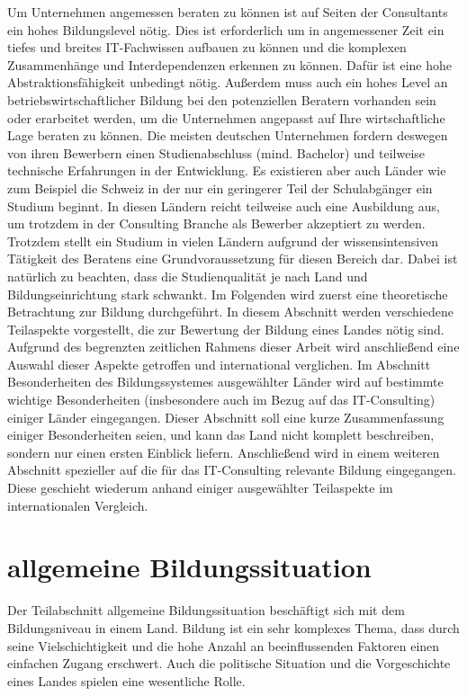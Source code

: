 Um Unternehmen angemessen beraten zu können ist auf Seiten der Consultants ein hohes Bildungslevel nötig. Dies ist erforderlich um in angemessener Zeit ein tiefes und breites IT-Fachwissen aufbauen zu können und die komplexen Zusammenhänge und Interdependenzen erkennen zu können. Dafür ist eine hohe Abstraktionsfähigkeit unbedingt nötig. Außerdem muss auch ein hohes Level an betriebswirtschaftlicher Bildung bei den potenziellen Beratern vorhanden sein oder erarbeitet werden, um die Unternehmen angepasst auf Ihre wirtschaftliche Lage beraten zu können.
Die meisten deutschen Unternehmen fordern deswegen von ihren Bewerbern einen Studienabschluss (mind. Bachelor) und teilweise technische Erfahrungen in der Entwicklung. Es existieren aber auch Länder wie zum Beispiel die Schweiz in der nur ein geringerer Teil der Schulabgänger ein Studium beginnt. In diesen Ländern reicht teilweise auch eine Ausbildung aus, um trotzdem in der Consulting Branche als Bewerber akzeptiert zu werden.
Trotzdem stellt ein Studium in vielen Ländern aufgrund der wissensintensiven Tätigkeit des Beratens eine Grundvoraussetzung für diesen Bereich dar. Dabei ist natürlich zu beachten, dass die Studienqualität je nach Land und Bildungseinrichtung stark schwankt.
Im Folgenden wird zuerst eine theoretische Betrachtung zur Bildung durchgeführt. In diesem Abschnitt werden verschiedene Teilaspekte vorgestellt, die zur Bewertung der Bildung eines Landes nötig sind. Aufgrund des begrenzten zeitlichen Rahmens dieser Arbeit wird anschließend eine Auswahl dieser Aspekte getroffen und international verglichen.
 Im Abschnitt Besonderheiten des Bildungssystemes ausgewählter Länder wird auf bestimmte wichtige Besonderheiten (insbesondere auch im Bezug auf das IT-Consulting) einiger Länder eingegangen. Dieser Abschnitt soll eine kurze Zusammenfassung einiger Besonderheiten seien, und kann das Land nicht komplett beschreiben, sondern nur einen ersten Einblick liefern.
 Anschließend wird in einem weiteren Abschnitt spezieller auf die für das IT-Consulting relevante Bildung eingegangen. Diese geschieht wiederum anhand einiger ausgewählter Teilaspekte im internationalen Vergleich.


\section{allgemeine Bildungssituation}
Der Teilabschnitt allgemeine Bildungssituation beschäftigt sich mit dem Bildungsniveau in einem Land. Bildung ist ein sehr komplexes Thema, dass durch seine Vielschichtigkeit und die hohe Anzahl an beeinflussenden Faktoren einen einfachen Zugang erschwert. Auch die politische Situation und die Vorgeschichte eines Landes spielen eine wesentliche Rolle.

